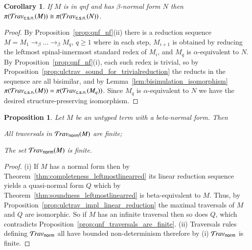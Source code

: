\documentclass{elsarticle}
\theoremstyle{plain}
\newtheorem{proposition}[theorem]{Proposition}
\newtheorem{corollary}[theorem]{Corollary}
\theoremstyle{definition}
\newcommand{\normalizing}{{\sf norm}}
\newcommand{\travsetnorm}{\travset_\normalizing} %
\newcommand{\travsetscn}{\travset_{\sf c.s.n.}} %
\def\coresymbol{\pi} %
\newcommand{\core}[1]{\coresymbol(#1)} %
\begin{document}
\begin{corollary}
\label{cor:qnf_and_nf_traveset_invariant}
If $M$ is in \emph{qnf} and has $\beta$-normal form $N$ then $\coresymbol(\travsetscn(M)) \cong \coresymbol(\travsetscn(N))$.
\end{corollary}
\begin{proof}
By Proposition~\ref{prop:qnf_nf}(ii) %
 there is a reduction sequence $M = M_1 \rightarrow_\beta \ldots \rightarrow_\beta M_q$, $q\geq1$  where in each step, $M_{i+1}$ is obtained by reducing the leftmost spinal-innermost standard redex of $M_i$,
and $M_q$ is $\alpha$-equivalent to $N$.
By Proposition~\ref{prop:qnf_nf}(i), each such redex is trivial, so by Proposition~\ref{prop:ulctrav_sound_for_trivialreduction}
the reducts in the sequence are all bisimilar, and by Lemma~\ref{lem:bisimulation_isomorphism}
$\core{\travsetscn(M)} = \core{\travsetscn(M_q)}$. Since $M_q$ is $\alpha$-equivalent to $N$ we have the desired structure-preserving isomorphism.
\end{proof}

\begin{proposition}
\label{prop:ulc_travnorm_finite}
Let $M$ be an untyped term with a beta-normal form. Then
\begin{enumerate*}[label=(\roman*)]
\item All traversals in $\travsetnorm(M)$ are finite;
\item The set $\travsetnorm(M)$ is finite.
\end{enumerate*}
\end{proposition}
\begin{proof}
(i) If $M$ has a normal form then by Theorem~\ref{thm:completeness_leftmostlinearred} its linear reduction sequence yields a quasi-normal form $Q$ which by Theorem~\ref{thm:soundness_leftmostlinearred} is beta-equivalent to $M$. Thus, by Proposition~\ref{prop:ulctrav_impl_linear_reduction} the maximal traversals of $M$ and $Q$ are isomorphic. So if $M$ has an infinite traversal then so does $Q$, which contradicts Proposition~\ref{prop:qnf_traversals_are_finite}.
(ii) Traversals rules defining $\travsetnorm$ all have bounded non-determinism therefore by (i) $\travsetnorm$ is finite.
\end{proof}
\end{document}
